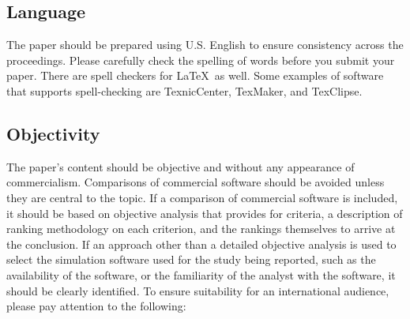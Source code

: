 \documentclass{scspaperproc}
\theoremstyle{scsthe}
\begin{document}
    \subsection{Language}

    The paper should be prepared using U.S. English to ensure consistency across the proceedings. Please carefully check the spelling of words before you submit your paper. There are spell checkers for \LaTeX\ as well.
    Some examples of software that supports spell-checking are TexnicCenter, TexMaker, and TexClipse.

    \subsection{Objectivity}
    The paper's content should be objective and without any appearance of commercialism.  Comparisons of commercial software should be avoided unless they are central to the topic.  If a comparison of commercial software is included, it should be based on objective analysis that provides for criteria, a description of ranking methodology on each criterion, and the rankings themselves to arrive at the conclusion.
    If an approach other than a detailed objective analysis is used to select the simulation software used for the study being reported, such as the availability of the software, or the familiarity of the analyst with the software, it should be clearly identified. To ensure suitability for an international audience, please pay attention to the following:
\end{document}
